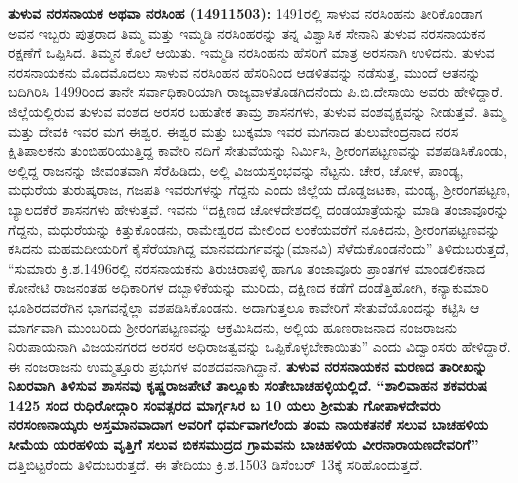 \textbf{ತುಳುವ ನರಸನಾಯಕ ಅಥವಾ ನರಸಿಂಹ (1491\general{\enginline{-}}1503): } 1491ರಲ್ಲಿ ಸಾಳುವ ನರಸಿಂಹನು ತೀರಿಕೊಂಡಾಗ ಅವನ ಇಬ್ಬರು ಪುತ್ರರಾದ ತಿಮ್ಮ ಮತ್ತು ಇಮ್ಮಡಿ ನರಸಿಂಹರನ್ನು ತನ್ನ ವಿಶ್ವಾಸಿಕ ಸೇನಾನಿ ತುಳುವ ನರಸನಾಯಕನ ರಕ್ಷಣೆಗೆ ಒಪ್ಪಿಸಿದ. ತಿಮ್ಮನ ಕೊಲೆ ಆಯಿತು. ಇಮ್ಮಡಿ ನರಸಿಂಹನು ಹೆಸರಿಗೆ ಮಾತ್ರ ಅರಸನಾಗಿ ಉಳಿದನು. ತುಳುವ ನರಸನಾಯಕನು ಮೊದಮೊದಲು ಸಾಳುವ ನರಸಿಂಹನ ಹೆಸರಿನಿಂದ ಆಡಳಿತವನ್ನು ನಡೆಸುತ್ತ, ಮುಂದೆ ಆತನನ್ನು ಬದಿಗಿರಿಸಿ 1499ರಿಂದ ತಾನೇ ಸರ್ವಾಧಿಕಾರಿಯಾಗಿ ರಾಜ್ಯವಾಳತೊಡಗಿದನೆಂದು ಪಿ.ಬಿ.ದೇಸಾಯಿ ಅವರು ಹೇಳಿದ್ದಾರೆ. ಜಿಲ್ಲೆಯಲ್ಲಿರುವ ತುಳುವ ವಂಶದ ಅರಸರ ಬಹುತೇಕ ತಾಮ್ರ ಶಾಸನಗಳು, ತುಳುವ ವಂಶವೃಕ್ಷವನ್ನು ನೀಡುತ್ತವೆ. ತಿಮ್ಮ ಮತ್ತು ದೇವಕಿ ಇವರ ಮಗ ಈಶ್ವರ. ಈಶ್ವರ ಮತ್ತು ಬುಕ್ಕಮಾ ಇವರ ಮಗನಾದ ತುಲುವೇಂದ್ರನಾದ ನರಸ ಕ್ಷಿತಿಪಾಲಕನು ತುಂಬಿಹರಿಯುತ್ತಿದ್ದ ಕಾವೇರಿ ನದಿಗೆ ಸೇತುವೆಯನ್ನು ನಿರ್ಮಿಸಿ, ಶ‍್ರೀರಂಗಪಟ್ಟಣವನ್ನು ವಶಪಡಿಸಿಕೊಂಡು, ಅಲ್ಲಿದ್ದ ರಾಜನನ್ನು ಜೀವಂತವಾಗಿ ಸೆರೆಹಿಡಿದು, ಅಲ್ಲಿ ವಿಜಯಸ್ತಂಭವನ್ನು ನೆಟ್ಟನು. ಚೇರ, ಚೋಳ, ಪಾಂಡ್ಯ, ಮಧುರೆಯ ತುರುಷ್ಕರಾಜ, ಗಜಪತಿ ಇವರುಗಳನ್ನು ಗೆದ್ದನು ಎಂದು ಜಿಲ್ಲೆಯ ದೊಡ್ಡಜಟಕಾ, ಮಂಡ್ಯ, ಶ‍್ರೀರಂಗಪಟ್ಟಣ, ಬ್ಯಾಲದಕೆರೆ ಶಾಸನಗಳು ಹೇಳುತ್ತವೆ. ಇವನು “ದಕ್ಷಿಣದ ಚೋಳದೇಶದಲ್ಲಿ ದಂಡಯಾತ್ರೆಯನ್ನು ಮಾಡಿ ತಂಜಾವೂರನ್ನು ಗೆದ್ದನು, ಮಧುರೆಯನ್ನು ಕಿತ್ತುಕೊಂಡನು, ರಾಮೇಶ್ವರದ ಮೇಲಿಂದ ಲಂಕೆಯವರೆಗೆ ನೂಕಿದನು, ಶ‍್ರೀರಂಗಪಟ್ಟಣವನ್ನು ಕಸಿದನು ಮಹಮದೀಯರಿಗೆ ಕೈಸೆರೆಯಾಗಿದ್ದ ಮಾನವದುರ್ಗವನ್ನು(ಮಾನವಿ) ಸೆಳೆದುಕೊಂಡನೆಂದು” ತಿಳಿದುಬರುತ್ತದೆ, “ಸುಮಾರು ಕ್ರಿ.ಶ.1496ರಲ್ಲಿ ನರಸನಾಯಕನು ತಿರುಚಿರಾಪಳ್ಳಿ ಹಾಗೂ ತಂಜಾವೂರು ಪ್ರಾಂತಗಳ ಮಾಂಡಲಿಕನಾದ ಕೋನೇಟಿ ರಾಜನಂತಹ ಅಧಿಕಾರಿಗಳ ದಬ್ಬಾಳಿಕೆಯನ್ನು ಮುರಿದು, ದಕ್ಷಿಣದ ಕಡೆಗೆ ದಂಡೆತ್ತಿಹೋಗಿ, ಕನ್ಯಾಕುಮಾರಿ ಭೂಶಿರದವರೆಗಿನ ಭಾಗವನ್ನೆಲ್ಲಾ ವಶಪಡಿಸಿಕೊಂಡನು. ಅದಾಗುತ್ತಲೂ ಕಾವೇರಿಗೆ ಸೇತುವೆಯೊಂದನ್ನು ಕಟ್ಟಿಸಿ ಆ ಮಾರ್ಗವಾಗಿ ಮುಂಬರಿದು ಶ‍್ರೀರಂಗಪಟ್ಟಣ\-ವನ್ನು ಆಕ್ರಮಿಸಿದನು, ಅಲ್ಲಿಯ ಹೂಣರಾಜನಾದ ನಂಜರಾಜನು ನಿರುಪಾಯನಾಗಿ ವಿಜಯನಗರದ ಅರಸರ ಅಧಿರಾಜತ್ವವನ್ನು ಒಪ್ಪಿಕೊಳ್ಳ\-ಬೇಕಾಯಿತು” ಎಂದು ವಿದ್ವಾಂಸರು ಹೇಳಿದ್ದಾರೆ. ಈ ನಂಜರಾಜನು ಉಮ್ಮತ್ತೂರು ಪ್ರಭುಗಳ ವಂಶದವನಾಗಿದ್ದಾನೆ. \textbf{ತುಳುವ ನರಸನಾಯಕನ ಮರಣದ ತಾರೀಖನ್ನು ನಿಖರವಾಗಿ ತಿಳಿಸುವ ಶಾಸನವು ಕೃಷ್ಣರಾಜಪೇಟೆ ತಾಲ್ಲೂಕು ಸಂತೇಬಾಚಹಳ್ಳಿ\-ಯಲ್ಲಿದೆ.} \textbf{“ಶಾಲಿವಾಹನ ಶಕವರುಷ 1425 ಸಂದ ರುಧಿರೋದ್ಗಾರಿ ಸಂವತ್ಸರದ ಮಾರ್ಗ್ಗಸಿರ ಬ 10 ಯಲು ಶ‍್ರೀಮತು ಗೋಪಾಳದೇವರು ನರಸಂಣನಾಯ್ಕರು ಅಸ್ತಮಾನವಾದಾಗ ಅವರಿಗೆ ಧರ್ಮವಾಗಲೆಂದು ತಂಮ ನಾಯಕತನಕೆ ಸಲುವ ಬಾಚಹಳಿಯ ಸೀಮೆಯ ಯರಹಳಿಯ ವೃತ್ತಿಗೆ ಸಲುವ ಬಿಕಸಮುದ್ರದ ಗ್ರಾಮವನು ಬಾಚಿಹಳಿಯ ವೀರನಾರಾಯಣದೇವರಿಗೆ”} ದತ್ತಿಬಿಟ್ಟರೆಂದು ತಿಳಿದುಬರುತ್ತದೆ. ಈ ತೇದಿಯು ಕ್ರಿ.ಶ.1503 ಡಿಸೆಂಬರ್​ 13ಕ್ಕೆ ಸರಿಹೊಂದುತ್ತದೆ.

